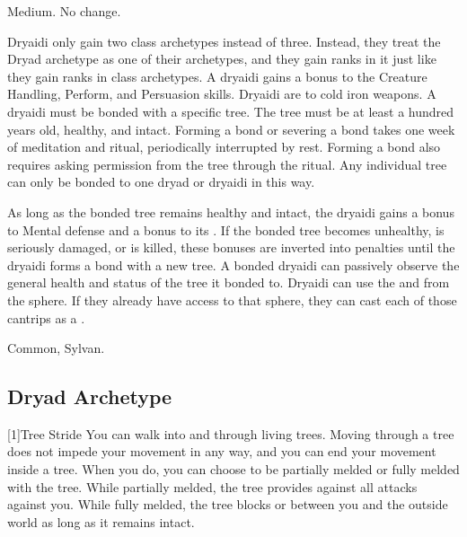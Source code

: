      Medium.
     No change.
    \begin{itemize}
         Dryaidi only gain two class archetypes instead of three.
            Instead, they treat the Dryad archetype as one of their archetypes, and they gain ranks in it just like they gain ranks in class archetypes.
         A dryaidi gains a  bonus to the Creature Handling, Perform, and Persuasion skills.
         Dryaidi are \vulnerable to cold iron weapons.
         A dryaidi must be bonded with a specific tree.
        The tree must be at least a hundred years old, healthy, and intact.
        Forming a bond or severing a bond takes one week of meditation and ritual, periodically interrupted by rest.
        Forming a bond also requires asking permission from the tree through the ritual.
        Any individual tree can only be bonded to one dryad or dryaidi in this way.

        As long as the bonded tree remains healthy and intact, the dryaidi gains a  bonus to Mental defense and a  bonus to its .
        If the bonded tree becomes unhealthy, is seriously damaged, or is killed, these bonuses are inverted into penalties until the dryaidi forms a bond with a new tree.
        A bonded dryaidi can passively observe the general health and status of the tree it bonded to.
         Dryaidi can use the  and   from the  sphere.
        If they already have access to that sphere, they can cast each of those cantrips as a .
    \end{itemize}
     Common, Sylvan.

    \subsection{Dryad Archetype}

        [1]{Tree Stride} You can walk into and through living trees.
        Moving through a tree does not impede your movement in any way, and you can end your movement inside a tree.
        When you do, you can choose to be partially melded or fully melded with the tree.
        While partially melded, the tree provides  against all attacks against you.
        While fully melded, the tree blocks  or  between you and the outside world as long as it remains intact.

